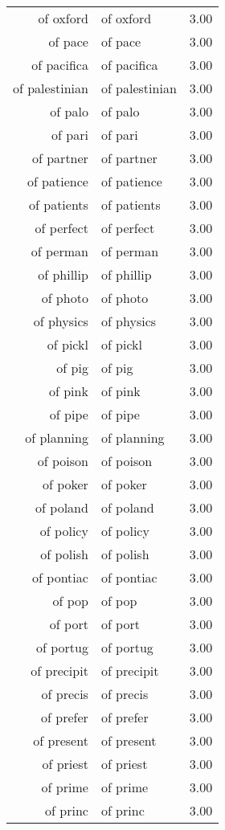 \begin{table}[ht]
\begin{tabular}{rlr}
  of oxford & of oxford & 3.00 \\ 
  of pace & of pace & 3.00 \\ 
  of pacifica & of pacifica & 3.00 \\ 
  of palestinian & of palestinian & 3.00 \\ 
  of palo & of palo & 3.00 \\ 
  of pari & of pari & 3.00 \\ 
  of partner & of partner & 3.00 \\ 
  of patience & of patience & 3.00 \\ 
  of patients & of patients & 3.00 \\ 
  of perfect & of perfect & 3.00 \\ 
  of perman & of perman & 3.00 \\ 
  of phillip & of phillip & 3.00 \\ 
  of photo & of photo & 3.00 \\ 
  of physics & of physics & 3.00 \\ 
  of pickl & of pickl & 3.00 \\ 
  of pig & of pig & 3.00 \\ 
  of pink & of pink & 3.00 \\ 
  of pipe & of pipe & 3.00 \\ 
  of planning & of planning & 3.00 \\ 
  of poison & of poison & 3.00 \\ 
  of poker & of poker & 3.00 \\ 
  of poland & of poland & 3.00 \\ 
  of policy & of policy & 3.00 \\ 
  of polish & of polish & 3.00 \\ 
  of pontiac & of pontiac & 3.00 \\ 
  of pop & of pop & 3.00 \\ 
  of port & of port & 3.00 \\ 
  of portug & of portug & 3.00 \\ 
  of precipit & of precipit & 3.00 \\ 
  of precis & of precis & 3.00 \\ 
  of prefer & of prefer & 3.00 \\ 
  of present & of present & 3.00 \\ 
  of priest & of priest & 3.00 \\ 
  of prime & of prime & 3.00 \\ 
  of princ & of princ & 3.00 \\ 

\end{tabular}
\end{table}
